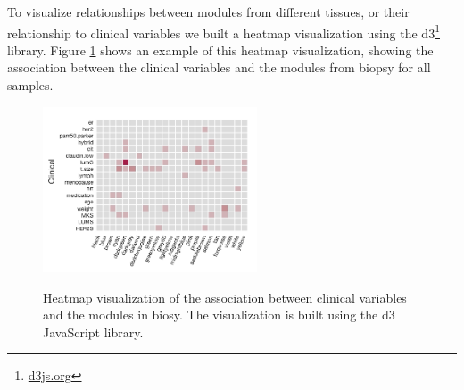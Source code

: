 To visualize relationships between modules from different tissues, or their
relationship to clinical variables we built a heatmap visualization using the 
d3\footnote{\url{d3js.org}} library. Figure \ref{fig_second_case} shows an
example of this heatmap visualization, showing the association between the
clinical variables and the modules from biopsy for all samples.  

\begin{figure}[h!]
\centering
\caption{Heatmap visualization of the association between clinical variables and
the modules in biosy. The visualization is built using the d3 JavaScript
library.} 
\includegraphics[width=2.5in]{figures/clinical-comp.png}
\label{fig_second_case}
\end{figure} 
